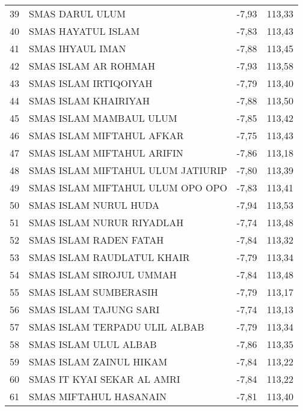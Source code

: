 {\begin{longtable}[c]{clll}
\rowcolor[HTML]{D9E1F2} 
39 & SMAS DARUL ULUM                       & -7,93 & 113,33 \\
40 & SMAS   HAYATUL ISLAM                  & -7,83 & 113,43 \\
\rowcolor[HTML]{D9E1F2} 
41 & SMAS IHYAUL IMAN                      & -7,88 & 113,45 \\
42 & SMAS   ISLAM AR ROHMAH                & -7,93 & 113,58 \\
\rowcolor[HTML]{D9E1F2} 
43 & SMAS ISLAM IRTIQOIYAH                 & -7,79 & 113,40 \\
44 & SMAS   ISLAM KHAIRIYAH                & -7,88 & 113,50 \\
\rowcolor[HTML]{D9E1F2} 
45 & SMAS ISLAM MAMBAUL ULUM               & -7,85 & 113,42 \\
46 & SMAS   ISLAM MIFTAHUL AFKAR           & -7,75 & 113,43 \\
\rowcolor[HTML]{D9E1F2} 
47 & SMAS ISLAM MIFTAHUL ARIFIN            & -7,86 & 113,18 \\
48 & SMAS   ISLAM MIFTAHUL ULUM JATIURIP   & -7,80 & 113,39 \\
\rowcolor[HTML]{D9E1F2} 
49 & SMAS ISLAM MIFTAHUL ULUM OPO OPO      & -7,83 & 113,41 \\
50 & SMAS   ISLAM NURUL HUDA               & -7,94 & 113,53 \\
\rowcolor[HTML]{D9E1F2} 
51 & SMAS ISLAM NURUR RIYADLAH             & -7,74 & 113,48 \\
52 & SMAS   ISLAM RADEN FATAH              & -7,84 & 113,32 \\
\rowcolor[HTML]{D9E1F2} 
53 & SMAS ISLAM RAUDLATUL KHAIR            & -7,79 & 113,34 \\
54 & SMAS   ISLAM SIROJUL UMMAH            & -7,84 & 113,48 \\
\rowcolor[HTML]{D9E1F2} 
55 & SMAS ISLAM SUMBERASIH                 & -7,79 & 113,17 \\
56 & SMAS   ISLAM TAJUNG SARI              & -7,74 & 113,13 \\
\rowcolor[HTML]{D9E1F2} 
57 & SMAS ISLAM TERPADU ULIL ALBAB         & -7,79 & 113,34 \\
58 & SMAS   ISLAM ULUL ALBAB               & -7,86 & 113,35 \\
\rowcolor[HTML]{D9E1F2} 
59 & SMAS ISLAM ZAINUL HIKAM               & -7,84 & 113,22 \\
60 & SMAS IT   KYAI SEKAR AL AMRI          & -7,84 & 113,22 \\
\rowcolor[HTML]{D9E1F2} 
61 & SMAS MIFTAHUL HASANAIN                & -7,81 & 113,40 \\

\end{longtable}}
